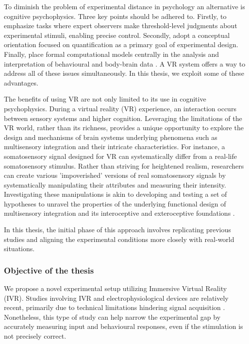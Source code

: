\documentclass[12pt,oneside,openright]{report}
\begin{document}
To diminish the problem of experimental distance in psychology an alternative is cognitive psychophysics. Three key points should be adhered to. Firstly, to emphasize tasks where expert observers make threshold-level judgments about experimental stimuli, enabling precise control. Secondly, adopt a conceptual orientation focused on quantification as a primary goal of experimental design. Finally, place formal computational models centrally in the analysis and interpretation of behavioural and body-brain data \parencite{WASKOM2019100}. A VR system offers a way to address all of these issues simultaneously. In this thesis, we exploit some of these advantages. 

The benefits of using VR are not only limited to its use in cognitive psychophysics. During a virtual reality (VR) experience, an interaction occurs between sensory systems and higher cognition. Leveraging the limitations of the VR world, rather than its richness, provides a unique opportunity to explore the design and mechanisms of brain systems underlying phenomena such as multisensory integration and their intricate characteristics. For instance, a somatosensory signal designed for VR can systematically differ from a real-life somatosensory stimulus. Rather than striving for heightened realism, researchers can create various 'impoverished' versions of real somatosensory signals by systematically manipulating their attributes and measuring their intensity. Investigating these manipulations is akin to developing and testing a set of hypotheses to unravel the properties of the underlying functional design of multisensory integration and its interoceptive and exteroceptive foundations \parencite{deGelder2018VirtualRA}.

In this thesis, the initial phase of this approach involves replicating previous studies and aligning the experimental conditions more closely with real-world situations.


\subsubsection*{Objective of the thesis}

We propose a novel experimental setup utilizing Immersive Virtual Reality (IVR). Studies involving IVR and electrophysiological devices are relatively recent, primarily due to technical limitations hindering signal acquisition \parencite{Klotzsche2023,Kisker2024InducedOB}. Nonetheless, this type of study can help narrow the experimental gap by accurately measuring input and behavioural responses, even if the stimulation is not precisely correct.
\end{document}
